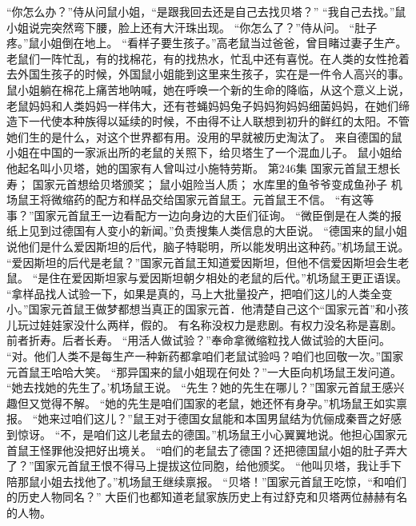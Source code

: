 \documentclass[a4paper,12pt,UTF8,twoside]{ctexbook}
\begin{document}
        “你怎么办？”侍从问鼠小姐，“是跟我回去还是自己去找贝塔？”  
        “我自己去找。”鼠小姐说完突然弯下腰，脸上还有大汗珠出现。  
        “你怎么了？”侍从问。  
        “肚子疼。”鼠小姐倒在地上。  
        “看样子要生孩子。”高老鼠当过爸爸，曾目睹过妻子生产。  
        老鼠们一阵忙乱，有的找棉花，有的找热水，忙乱中还有喜悦。在人类的女性抢着去外国生孩子的时候，外国鼠小姐能到这里来生孩子，实在是一件令人高兴的事。  
        鼠小姐躺在棉花上痛苦地呐喊，她在呼唤一个新的生命的降临，从这个意义上说，老鼠妈妈和人类妈妈一样伟大，还有苍蝇妈妈兔子妈妈狗妈妈细菌妈妈，在她们缔造下一代使本种族得以延续的时候，不由得不让人联想到初升的鲜红的太阳。不管她们生的是什么，对这个世界都有用。没用的早就被历史淘汰了。  
        来自德国的鼠小姐在中国的一家派出所的老鼠的关照下，给贝塔生了一个混血儿子。  
        鼠小姐给他起名叫小贝塔，她的国家有人曾叫过小施特劳斯。          第246集  
        国家元首鼠王想长寿；  
        国家元首想给贝塔颁奖；  
        鼠小姐险当人质；  
        水库里的鱼爷爷变成鱼孙子    
        机场鼠王将微缩药的配方和样品交给国家元首鼠王。元首鼠王不信。  
        “有这等事？”国家元首鼠王一边看配方一边向身边的大臣们征询。  
        “微臣倒是在人类的报纸上见到过德国有人变小的新闻。”负责搜集人类信息的大臣说。  
        “德国来的鼠小姐说他们是什么爱因斯坦的后代，脑子特聪明，所以能发明出这种药。”机场鼠王说。  
        “爱因斯坦的后代是老鼠？”国家元首鼠王知道爱因斯坦，但他不信爱因斯坦会生老鼠。        
        “是住在爱因斯坦家与爱因斯坦朝夕相处的老鼠的后代。”机场鼠王更正语误。  
        “拿样品找人试验一下，如果是真的，马上大批量投产，把咱们这儿的人类全变小。”国家元首鼠王做梦都想当真正的国家元首．他清楚自己这个“国家元首”和小孩儿玩过娃娃家没什么两样，假的。  
        有名称没权力是悲剧。有权力没名称是喜剧。前者折寿。后者长寿。  
        “用活人做试验？”奉命拿微缩粒找人做试验的大臣问。  
        “对。他们人类不是每生产一种新药都拿咱们老鼠试验吗？咱们也回敬一次。”国家元首鼠王哈哈大笑。  
        “那异国来的鼠小姐现在何处？”一大臣向机场鼠王发问道。  
        “她去找她的先生了。’机场鼠王说。  
        “先生？她的先生在哪儿？”国家元首鼠王感兴趣但又觉得不解。  
        “她的先生是咱们国家的老鼠，她还怀有身孕。”机场鼠王如实禀报。  
        “她来过咱们这儿？”鼠王对于德国女鼠能和本国男鼠结为伉俪成秦晋之好感到惊讶。  
        “不，是咱们这儿老鼠去的德国。”机场鼠王小心翼翼地说。他担心国家元首鼠王怪罪他没把好出境关。  
        “咱们的老鼠去了德国？还把德国鼠小姐的肚子弄大了？”国家元首鼠王恨不得马上提拔这位同胞，给他颁奖。  
        “他叫贝塔，我让手下陪那鼠小姐去找他了。”机场鼠王继续禀报。  
        “贝塔！”国家元首鼠王吃惊，“和咱们的历史人物同名？”  
        大臣们也都知道老鼠家族历史上有过舒克和贝塔两位赫赫有名的人物。  
\end{document}
